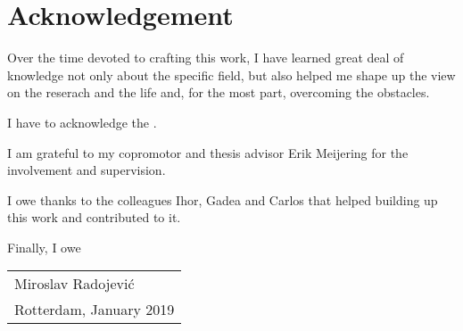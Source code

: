 %
% 

\chpos{14mm}{10mm}
\chapter*{Acknowledgement}

Over the time devoted to crafting this work, I have learned great deal of knowledge not only about the specific field, but also helped me shape up the view on the reserach and the life and, for the most part, overcoming the obstacles.  

I have to acknowledge the . 

I am grateful to my copromotor and thesis advisor Erik Meijering for the involvement and supervision.  

I owe thanks to the colleagues Ihor, Gadea and Carlos that helped building up this work and contributed to it.

Finally, I owe 

\bigskip
\begin{flushright}
  \begin{tabular}{@{}l@{}}
    Miroslav Radojevi\'{c}\\
    Rotterdam, January 2019
  \end{tabular}
\end{flushright}
